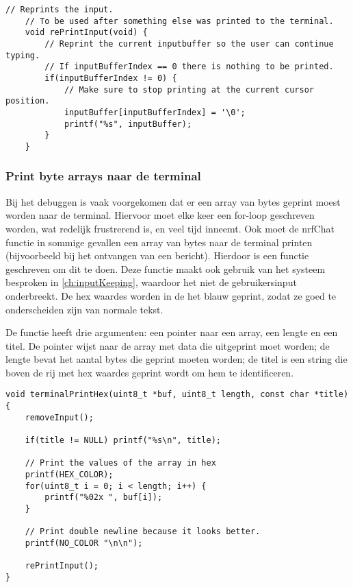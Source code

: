 \begin{lstlisting}[caption={De huidige input van de gebruiker opnieuw printen},captionpos=b,label={lst:reprintInput},style=c,xleftmargin=.\textwidth,xrightmargin=.\textwidth]
    // Reprints the input.
    // To be used after something else was printed to the terminal.
    void rePrintInput(void) {
        // Reprint the current inputbuffer so the user can continue typing.
        // If inputBufferIndex == 0 there is nothing to be printed.
        if(inputBufferIndex != 0) {
            // Make sure to stop printing at the current cursor position.
            inputBuffer[inputBufferIndex] = '\0';
            printf("%s", inputBuffer);
        }
    }
\end{lstlisting}

\subsubsection{Print byte arrays naar de terminal}
Bij het debuggen is vaak voorgekomen dat er een array van bytes geprint moest worden naar de terminal. Hiervoor moet elke keer een for-loop geschreven worden, wat redelijk frustrerend is, en veel tijd inneemt. Ook moet de nrfChat functie in sommige gevallen een array van bytes naar de terminal printen (bijvoorbeeld bij het ontvangen van een bericht). Hierdoor is een functie geschreven om dit te doen. Deze functie maakt ook gebruik van het systeem besproken in \autoref{ch:inputKeeping}, waardoor het niet de gebruikersinput onderbreekt. De hex waardes worden in de het blauw geprint, zodat ze goed te onderscheiden zijn van normale tekst.

De functie heeft drie argumenten: een pointer naar een array, een lengte en een titel. De pointer wijst naar de array met data die uitgeprint moet worden; de lengte bevat het aantal bytes die geprint moeten worden; de titel is een string die boven de rij met hex waardes geprint wordt om hem te identificeren.

\begin{lstlisting}[caption={Een hex string printen naar de terminal},captionpos=b,label={lst:terminalPrintHex},style=c,xleftmargin=.\textwidth,xrightmargin=.\textwidth]
void terminalPrintHex(uint8_t *buf, uint8_t length, const char *title) {
    removeInput();

    if(title != NULL) printf("%s\n", title);

    // Print the values of the array in hex
    printf(HEX_COLOR);
    for(uint8_t i = 0; i < length; i++) {
        printf("%02x ", buf[i]);
    }

    // Print double newline because it looks better.
    printf(NO_COLOR "\n\n");

    rePrintInput();
}
\end{lstlisting}

